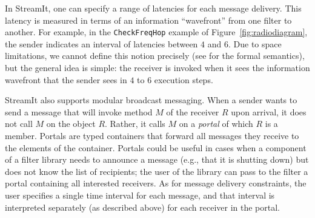 In StreamIt, one can specify a range of latencies for each message
delivery.  This latency is measured in terms of an information
``wavefront'' from one filter to another.  For example, in the
\texttt{CheckFreqHop} example of Figure~\ref{fig:radiodiagram}, the
sender indicates an interval of  latencies between $4$ and $6$.  Due
to  space limitations,  we cannot  define this  notion  precisely (see
\cite{streamittech620,streamittech622} for  the formal semantics), but
the general idea  is simple: the receiver is invoked  when it sees the
information wavefront that  the sender sees in $4$  to $6$ execution
steps.


%

StreamIt also supports
modular broadcast messaging.  When a sender wants to send a message
that will invoke method $M$ of the receiver $R$ upon arrival, it does
not call $M$ on the object $R$.  Rather, it calls $M$ on a
\emph{portal} of which $R$ is a member.  Portals are typed containers
that forward all messages they receive to the elements of the
container.  Portals could be useful in cases when a component of a
filter library needs to announce a message (e.g., that it is shutting
down) but does not know the list of recipients; the user of the
library can pass to the filter a portal containing all interested
receivers.  As for message delivery constraints, the user specifies a
single time interval for each message, and that interval is
interpreted separately (as described above) for each receiver in the
portal.

